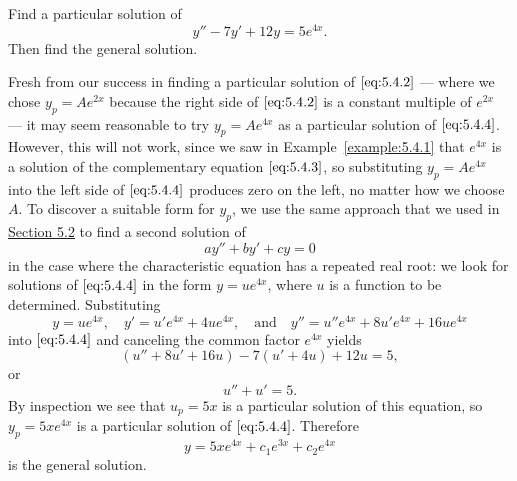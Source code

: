 \documentclass{ximera}
\begin{document}
\begin{example}\label{example:5.4.2}
Find a particular solution of
\begin{equation} \label{eq:5.4.4}
y''-7y'+12y=5e^{4x}.
\end{equation}
Then find the general solution.
 
\begin{explanation}
Fresh from our success in finding a particular solution of
$\eqref{eq:5.4.2}$ --- where we chose $y_p=Ae^{2x}$ because the right side
of
$\eqref{eq:5.4.2}$ is a constant multiple of $e^{2x}$ --- it may seem reasonable to try $y_p=Ae^{4x}$ as a particular solution of
$\eqref{eq:5.4.4}$. However, this will not work, since we saw in
Example~\ref{example:5.4.1} that $e^{4x}$ is a solution of the
complementary equation $\eqref{eq:5.4.3}$, so substituting $y_p=Ae^{4x}$
into the left side of $\eqref{eq:5.4.4}$ produces zero on the left, no
matter how we choose $A$. To discover a suitable form for $y_p$,
we use the same approach that we used in \href{https://xerxes.ximera.org/differentialequations/main/constantCoefficientHomogeneousEquations/constantCoefficientHomogeneousEquations}{Section 5.2} to find a
second solution of
$$
ay''+by'+cy=0
$$
in the case where the characteristic equation has a repeated real
root: we look for solutions of $\eqref{eq:5.4.4}$ in the form $y=ue^{4x}$,
where $u$ is a function to be determined. Substituting
\begin{equation} \label{eq:5.4.5}
y=ue^{4x},\quad
y'=u'e^{4x}+4ue^{4x},\quad\mbox{and}\quad
y''=u''e^{4x}+8u'e^{4x}+16ue^{4x}
\end{equation}
into $\eqref{eq:5.4.4}$ and canceling the common factor $e^{4x}$ yields
$$
(u''+8u'+16u)-7(u'+4u)+12u=5,
$$
or
$$
u''+u'=5.
$$
By inspection we  see that $u_p=5x$ is a particular solution of
this equation, so $y_p=5xe^{4x}$ is a particular solution of
$\eqref{eq:5.4.4}$. Therefore
$$
y=5xe^{4x}+c_1e^{3x}+c_2e^{4x}
$$
is the general solution.
\end{explanation}
\end{example}
 
\end{document}
